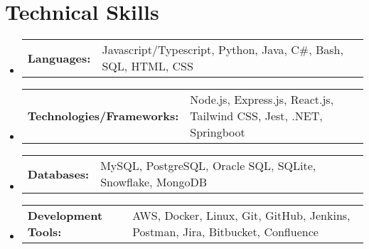 \documentclass[letterpaper,11pt]{article}
\makeatletter
\newcommand{\resumeSubItem}[2]{ 
  \item
    \begin{tabular*}{\textwidth}{@{}l p{\dimexpr\textwidth-1.5cm}@{}}{\small\textbf{#1}}\hspace{0.5em} & {\small #2} \\ 
    \end{tabular*}\vspace{-6pt}
}
\newcommand{\resumeSubHeadingListStart}{\begin{itemize}[leftmargin=0.0in, label={}]}
\newcommand{\resumeSubHeadingListEnd}{\end{itemize}}
\makeatother
\begin{document}
\section{Technical Skills}
  \resumeSubHeadingListStart
    \resumeSubItem{Languages:}
      {Javascript/Typescript, Python, Java, C\#, Bash, SQL, HTML, CSS}
    \resumeSubItem{Technologies/Frameworks:}
      {Node.js, Express.js, React.js, Tailwind CSS, Jest, .NET, Springboot}
    \resumeSubItem{Databases:}
      {MySQL, PostgreSQL, Oracle SQL, SQLite, Snowflake, MongoDB}
    \resumeSubItem{Development Tools:}
      {AWS, Docker, Linux, Git, GitHub, Jenkins, Postman, Jira, Bitbucket, Confluence}
  \resumeSubHeadingListEnd
\end{document}
